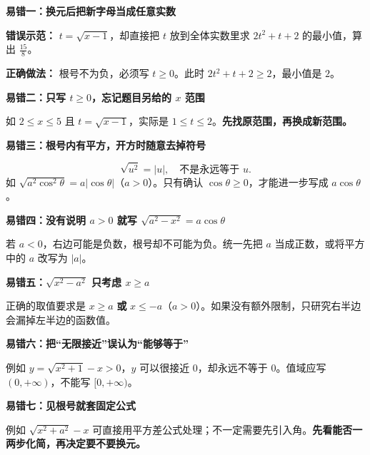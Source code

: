 \clearpage
\begin{trapbox}
  \textbf{\textcolor{CTrap}{易错一：换元后把新字母当成任意实数}}

  \textbf{错误示范：} $t=\sqrt{x-1}$，却直接把 $t$ 放到全体实数里求 $2t^2+t+2$ 的最小值，算出 $\frac{15}{8}$。

  \textbf{正确做法：} 根号不为负，必须写 $t\ge0$。此时 $2t^2+t+2\ge2$，最小值是 $2$。

  \medskip
  \textbf{\textcolor{CTrap}{易错二：只写 $t\ge0$，忘记题目另给的 $x$ 范围}}

  如 $2\le x\le5$ 且 $t=\sqrt{x-1}$，实际是 $1\le t\le2$。\textbf{先找原范围，再换成新范围。}

  \medskip
  \textbf{\textcolor{CTrap}{易错三：根号内有平方，开方时随意去掉符号}}

  \[
    \sqrt{u^2}=|u|,\quad\text{不是永远等于 }u.
  \]
  如 $\sqrt{a^2\cos^2\theta}=a|\cos\theta|$（$a>0$）。只有确认 $\cos\theta\ge0$，才能进一步写成 $a\cos\theta$。

  \medskip
  \textbf{\textcolor{CTrap}{易错四：没有说明 $a>0$ 就写 $\sqrt{a^2-x^2}=a\cos\theta$}}

  若 $a<0$，右边可能是负数，根号却不可能为负。统一先把 $a$ 当成正数，或将平方中的 $a$ 改写为 $|a|$。

  \medskip
  \textbf{\textcolor{CTrap}{易错五：$\sqrt{x^2-a^2}$ 只考虑 $x\ge a$}}

  正确的取值要求是 $x\ge a$ \textbf{或} $x\le-a$（$a>0$）。如果没有额外限制，只研究右半边会漏掉左半边的函数值。

  \medskip
  \textbf{\textcolor{CTrap}{易错六：把“无限接近”误认为“能够等于”}}

  例如 $y=\sqrt{x^2+1}-x>0$，$y$ 可以很接近 $0$，却永远不等于 $0$。值域应写 $(0,+\infty)$，不能写 $[0,+\infty)$。

  \medskip
  \textbf{\textcolor{CTrap}{易错七：见根号就套固定公式}}

  例如 $\sqrt{x^2+a^2}-x$ 可直接用平方差公式处理；不一定需要先引入角。\textbf{先看能否一两步化简，再决定要不要换元。}
\end{trapbox}
